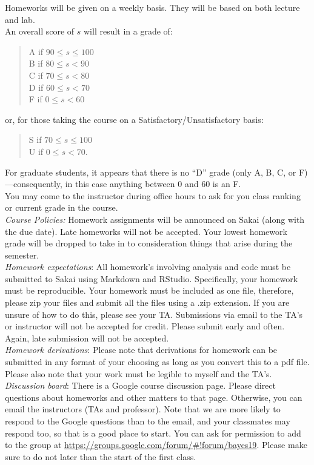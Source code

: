 \documentclass[11pt]{article}
\begin{document}
Homeworks will be given on a weekly basis. They will be based on both lecture and lab. \\

An overall score of $s$ will result in a grade of:
\begin{quote}
A if $90\leq s\leq 100$ \\
B if $80\leq s < 90$ \\
C if $70\leq s < 80$ \\
D if $60\leq s < 70$ \\
F if $0\leq s < 60$
\end{quote}
or, for those taking the course on a Satisfactory/Unsatisfactory basis:
\begin{quote}
S if $70\leq s\leq 100$ \\
U if $0\leq s < 70$.
\end{quote}
For graduate students, it appears that there is no ``D'' grade (only A, B, C, or F)---consequently, in this case anything between $0$ and $60$ is an F. \\

You may come to the instructor during office hours to ask for you class ranking or current grade in the course. \\

\emph{Course Policies:} 
Homework assignments will be announced on Sakai (along with the due date). Late homeworks will not be accepted. Your lowest homework grade will be dropped to take in to consideration things that arise during the semester. \\

\emph{Homework expectations}: All homework's involving analysis and code must be submitted to Sakai using Markdown and RStudio. Specifically, your homework must be reproducible. Your homework must be included as one file, therefore, please zip your files and submit all the files using a .zip extension. If you are unsure of how to do this, please see your TA. Submissions via email to the TA's or instructor will not be accepted for credit. Please submit early and often. Again, late submission will not be accepted. \\

\emph{Homework derivations}: Please note that derivations for homework can be submitted in any format of your choosing as long as you convert this to a pdf file. Please also note that your work must be legible to myself and the TA's. \\


\emph{Discussion board}:
There is a Google course discussion page. Please direct questions about homeworks and other matters to that page. Otherwise, you can email the instructors (TAs and professor). Note that we are more likely to respond to the Google questions than to the email, and your classmates may respond too, so that is a good place to start. You can ask for permission to add to the group at \url{https://groups.google.com/forum/#!forum/bayes19}. Please make sure to do not later than the start of the first class.\\
\end{document}
